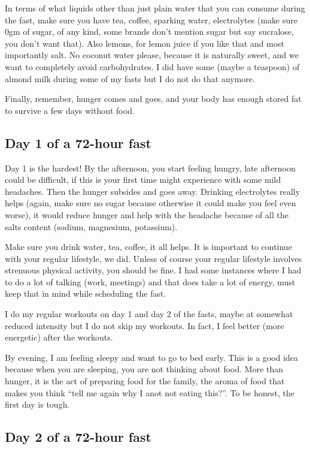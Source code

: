 \documentclass[
  oneside]{book}
\begin{document}
In terms of what liquids other than just plain water that you can consume during the fast, make sure you have tea, coffee, sparking water, electrolytes (make sure 0gm of sugar, of any kind, some brands don't mention sugar but say sucralose, you don't want that). Also lemons, for lemon juice if you like that and most importantly salt. No coconut water please, because it is naturally sweet, and we want to completely avoid carbohydrates. I did have some (maybe a teaspoon) of almond milk during some of my fasts but I do not do that anymore.

Finally, remember, hunger comes and goes, and your body has enough stored fat to survive a few days without food.

\hypertarget{day-1-of-a-72-hour-fast}{%
\subsection{Day 1 of a 72-hour fast}\label{day-1-of-a-72-hour-fast}}

Day 1 is the hardest! By the afternoon, you start feeling hungry, late afternoon could be difficult, if this is your first time might experience with some mild headaches. Then the hunger subsides and goes away. Drinking electrolytes really helps (again, make sure no sugar because otherwise it could make you feel even worse), it would reduce hunger and help with the headache because of all the salts content (sodium, magnesium, potassium).

Make sure you drink water, tea, coffee, it all helps. It is important to continue with your regular lifestyle, we did. Unless of course your regular lifestyle involves strenuous physical activity, you should be fine. I had some instances where I had to do a lot of talking (work, meetings) and that does take a lot of energy, must keep that in mind while scheduling the fast.

I do my regular workouts on day 1 and day 2 of the fasts, maybe at somewhat reduced intensity but I do not skip my workouts. In fact, I feel better (more energetic) after the workouts.

By evening, I am feeling sleepy and want to go to bed early. This is a good idea because when you are sleeping, you are not thinking about food. More than hunger, it is the act of preparing food for the family, the aroma of food that makes you think ``tell me again why I anot not eating this?''. To be honest, the first day is tough.

\hypertarget{day-2-of-a-72-hour-fast}{%
\subsection{Day 2 of a 72-hour fast}\label{day-2-of-a-72-hour-fast}}
\end{document}

